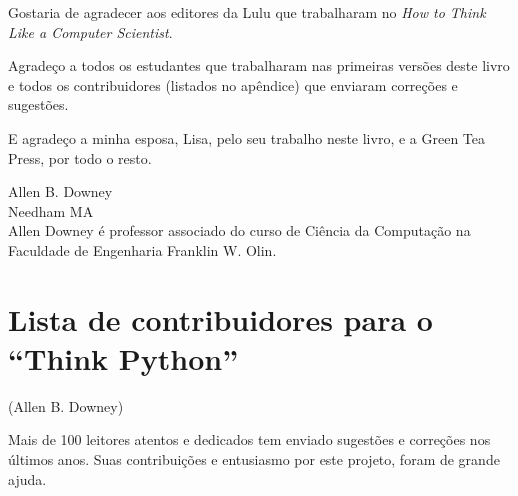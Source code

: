 
Gostaria de agradecer aos editores da Lulu que trabalharam no \emph{How to 
Think Like a Computer Scientist}.


Agradeço a todos os estudantes que trabalharam nas primeiras versões deste 
livro e todos os contribuidores (listados no apêndice) que enviaram correções 
e sugestões.


E agradeço a minha esposa, Lisa, pelo seu trabalho neste livro, e a Green 
Tea Press, por todo o resto.

Allen B. Downey \\
Needham MA\\


Allen Downey é professor associado do curso de Ciência da Computação na 
Faculdade de Engenharia Franklin W. Olin.

\section*{Lista de contribuidores para o ``Think Python''}


(Allen B. Downey)


Mais de 100 leitores atentos e dedicados tem enviado sugestões e correções 
nos últimos anos. Suas contribuições e entusiasmo por este projeto, foram de 
grande ajuda.


